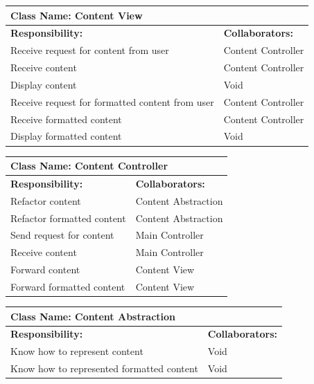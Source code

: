 \documentclass[]{article}
\begin{document}
	\begin{table}[H]
	\centering
		\begin{tabular}{|p{9cm}|p{3cm}|}
		\hline
		 \multicolumn{2}{|l|}{\textbf{Class Name: Content View}} \\
		\hline
		\textbf{Responsibility:} & \textbf{Collaborators:} \\
		\hline
		Receive request for content from user & Content Controller\\
		\hline
	    Receive content & Content Controller\\
	    \hline
	    Display content & Void\\
	    \hline 
	    Receive request for formatted content from user & Content Controller\\
	    \hline
	    Receive formatted content & Content Controller\\
	    \hline
	    Display formatted content & Void\\
	    \hline
		\end{tabular}
	\end{table}
	
	\begin{table}[H]
	\centering
		\begin{tabular}{|p{9cm}|p{3cm}|}
		\hline
		 \multicolumn{2}{|l|}{\textbf{Class Name: Content Controller}} \\
		\hline
		\textbf{Responsibility:} & \textbf{Collaborators:} \\
		\hline
	    Refactor content & Content Abstraction\\
		\hline
		Refactor formatted content & Content Abstraction\\
		\hline
	    Send request for content & Main Controller\\
		\hline
		Receive content & Main Controller\\
		\hline
		Forward content & Content View\\
		\hline
		Forward formatted content & Content View\\
		\hline
		\end{tabular}
	\end{table}
	
	\begin{table}[H]
	\centering
		\begin{tabular}{|p{9cm}|p{3cm}|}
		\hline
		 \multicolumn{2}{|l|}{\textbf{Class Name: Content Abstraction}} \\
		\hline
		\textbf{Responsibility:} & \textbf{Collaborators:} \\
		\hline
	    Know how to represent content  & Void\\
		\hline
		Know how to represented formatted content & Void\\
		\hline
		\end{tabular}
	\end{table}
	
\end{document}
